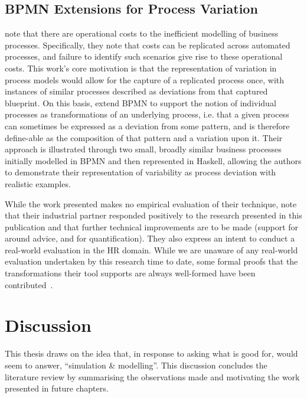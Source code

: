 \subsection{BPMN Extensions for Process Variation}

\citeauthor{Machado_2011} note that there are operational costs to the
inefficient modelling of business processes. Specifically, they note that costs
can be replicated across automated processes, and failure to identify such
scenarios give rise to these operational costs. This work's core motivation is
that the representation of variation in process models would allow for the
capture of a replicated process once, with instances of similar processes
described as deviations from that captured blueprint. On this basis,
\citeauthor{Machado_2011} extend BPMN to support the notion of individual
processes as transformations of an underlying process, i.e. that a given process
can sometimes be expressed as a deviation from some pattern, and is therefore
define-able as the composition of that pattern and a variation upon it. Their
approach is illustrated through two small, broadly similar business processes
initially modelled in BPMN and then represented in Haskell, allowing the authors
to demonstrate their representation of variability as process deviation with
realistic examples.

While the work presented makes no empirical evaluation of their technique,
\citeauthor{Machado_2011} note that their industrial partner responded
positively to the research presented in this publication and that further
technical improvements are to be made (support for around advice, and for
quantification). They also express an intent to conduct a real-world evaluation
in the HR domain. While we are unaware of any real-world evaluation undertaken
by this research time to date, some formal proofs that the transformations their
tool supports are always well-formed have been
contributed~\cite{machado2012formal}.



\section{Discussion}
\label{sec:lit_discussion}


This thesis draws on the idea that, in response to
  \citeauthor{steimann06paradoxical} asking what \aspectorientation{} is good for,
\citeauthor{gulyas1999use} would seem to answer, ``simulation \&
  modelling''. This discussion concludes the literature review by summarising
  the observations made and motivating the work presented in future chapters.

